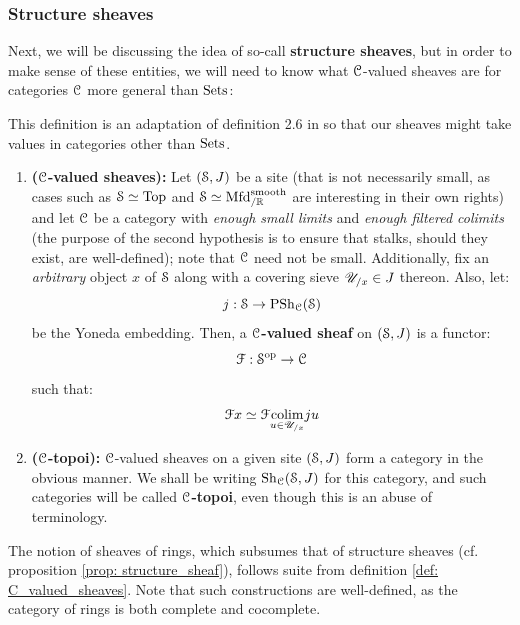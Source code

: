             \subsubsection{Structure sheaves}
                Next, we will be discussing the idea of so-call \textbf{structure sheaves}, but in order to make sense of these entities, we will need to know what $\C$-valued sheaves are for categories $\C$ more general than $\Sets$:
                \begin{definition} \label{def: C_valued_sheaves}
                    This definition is an adaptation of definition 2.6 in \cite{nlab:sheaf} so that our sheaves might take values in categories other than $\Sets$.
                    \begin{enumerate}
                        \item \textbf{($\C$-valued sheaves):} Let $(\S, J)$ be a site (that is not necessarily small, as cases such as $\S \cong \Top$ and $\S \cong \Mfd^{\smooth}_{/\R}$ are interesting in their own rights) and let $\C$ be a category with \textit{enough small limits} and \textit{enough filtered colimits} (the purpose of the second hypothesis is to ensure that stalks, should they exist, are well-defined); note that $\C$ need not be small. Additionally, fix an \textit{arbitrary} object $x$ of $\S$ along with a covering sieve $\U_{/x} \in J$ thereon. Also, let:
                            $$j: \S \to \Psh_{\C}(\S)$$
                        be the Yoneda embedding. Then, a \textbf{$\C$-valued sheaf} on $(\S, J)$ is a functor:
                            $$\calF: \S^{\op} \to \C$$
                        such that:
                            $$\calF x \cong \calF \underset{u \in \U_{/x}}{\colim} ju$$
                        \item \textbf{($\C$-topoi):} $\C$-valued sheaves on a given site $(\S, J)$ form a category in the obvious manner. We shall be writing $\Sh_{\C}(\S, J)$ for this category, and such categories will be called \textbf{$\C$-topoi}, even though this is an abuse of terminology.
                    \end{enumerate}
                \end{definition}
                \begin{example}
                    The notion of sheaves of rings, which subsumes that of structure sheaves (cf. proposition \ref{prop: structure_sheaf}), follows suite from definition \ref{def: C_valued_sheaves}. Note that such constructions are well-defined, as the category of rings is both complete and cocomplete.
                \end{example}
                
